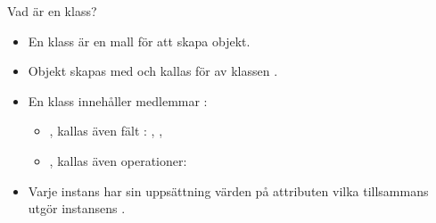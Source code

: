 



\begin{Slide}{Vad är en klass?}
\begin{itemize}
\item En klass är en mall för att skapa objekt.
\item Objekt skapas med  och kallas för   av klassen .
\item En klass innehåller medlemmar :
  \begin{itemize}
  \item {}, kallas även fält : , , 
  \item {}, kallas även operationer: 
  \end{itemize}
\item Varje instans har sin uppsättning värden på attributen
vilka tillsammans utgör instansens .
\end{itemize}

\end{Slide}



